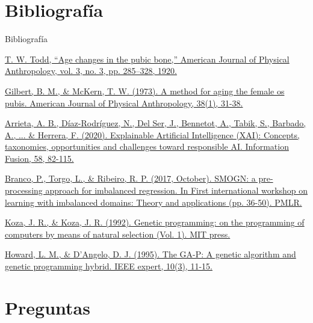 \documentclass{beamer}
\begin{document}
\section{Bibliografía}
\begin{frame}[allowframebreaks]{Bibliografía}

\begin{thebibliography}{9}


	\href{https://onlinelibrary.wiley.com/doi/abs/10.1002/ajpa.1330030301}{\scriptsize T. W. Todd, “Age changes in the pubic bone,” American Journal of Physical Anthropology, vol. 3, no. 3, pp. 285–328, 1920.}


	\href{https://onlinelibrary.wiley.com/doi/abs/10.1002/ajpa.1330380109}{\scriptsize Gilbert, B. M., \& McKern, T. W. (1973). A method for aging the female os pubis. American Journal of Physical Anthropology, 38(1), 31-38.}


	\href{https://www.sciencedirect.com/science/article/pii/S1566253519308103}{\scriptsize Arrieta, A. B., Díaz-Rodríguez, N., Del Ser, J., Bennetot, A., Tabik, S., Barbado, A., ... \& Herrera, F. (2020). Explainable Artificial Intelligence (XAI): Concepts, taxonomies, opportunities and challenges toward responsible AI. Information Fusion, 58, 82-115.}


	\href{http://proceedings.mlr.press/v74/branco17a/branco17a.pdf}{\scriptsize Branco, P., Torgo, L., \& Ribeiro, R. P. (2017, October). SMOGN: a pre-processing approach for imbalanced regression. In First international workshop on learning with imbalanced domains: Theory and applications (pp. 36-50). PMLR.}


	\href{https://mitpress.mit.edu/books/genetic-programming}{\scriptsize Koza, J. R., \& Koza, J. R. (1992). Genetic programming: on the programming of computers by means of natural selection (Vol. 1). MIT press.}


	\href{https://ieeexplore.ieee.org/stamp/stamp.jsp?tp=&arnumber=393137}{\scriptsize Howard, L. M., \& D'Angelo, D. J. (1995). The GA-P: A genetic algorithm and genetic programming hybrid. IEEE expert, 10(3), 11-15.}

\end{thebibliography}


\end{frame}


\section{Preguntas}
\end{document}
